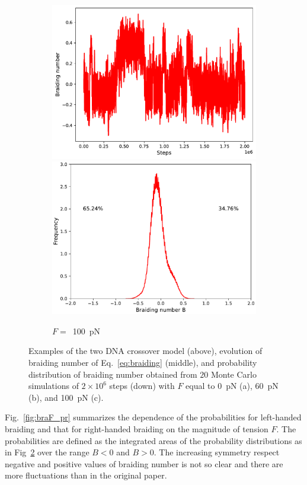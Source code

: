 \documentclass[a4paper,10pt]{article}
\begin{document}
\begin{figure}[tb]
\begin{subfigure}{.3\textwidth}
\includegraphics[width=\textwidth]{brF_100_braid.pdf}
\includegraphics[width=\textwidth]{brF_100_br_pr.pdf}
\caption{$F=$~\SI{100}{\pico\newton}}
\label{fig:braF_c}
\end{subfigure}
\caption{Examples of the two DNA crossover model (above), evolution of braiding number of Eq.~\ref{eq:braiding} (middle), and probability distribution of braiding number obtained from $20$ Monte Carlo simulations of $2\times 10^6$ steps (down) with $F$ equal to \SI{0}{\pico\newton} (a), \SI{60}{\pico\newton} (b), and \SI{100}{\pico\newton} (c).}
\label{fig:braF}
\end{figure}

Fig.~\ref{fig:braF_pr} summarizes the dependence of the probabilities for left-handed braiding and that for right-handed braiding on the magnitude of tension $F$.
The probabilities are defined as the integrated areas of the probability distributions as in Fig~\ref{fig:braF} over the range $B<0$ and $B>0$.
The increasing symmetry respect negative and positive values of braiding number is not so clear and there are more fluctuations than in the original paper.
\end{document}
